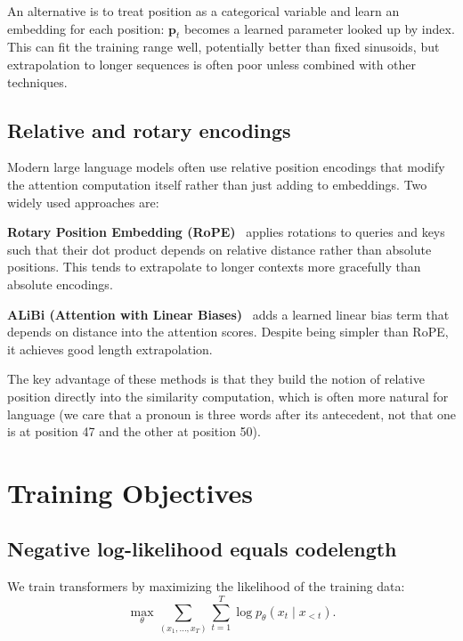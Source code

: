 An alternative is to treat position as a categorical variable and learn an embedding for each position: $\mathbf{p}_t$ becomes a learned parameter looked up by index. This can fit the training range well, potentially better than fixed sinusoids, but extrapolation to longer sequences is often poor unless combined with other techniques.

\subsection{Relative and rotary encodings}
\label{sec:relative}

Modern large language models often use relative position encodings that modify the attention computation itself rather than just adding to embeddings. Two widely used approaches are:

\textbf{Rotary Position Embedding (RoPE)}~\citep{su2021rope} applies rotations to queries and keys such that their dot product depends on relative distance rather than absolute positions. This tends to extrapolate to longer contexts more gracefully than absolute encodings.

\textbf{ALiBi (Attention with Linear Biases)}~\citep{press2022alibi} adds a learned linear bias term that depends on distance into the attention scores. Despite being simpler than RoPE, it achieves good length extrapolation.

The key advantage of these methods is that they build the notion of relative position directly into the similarity computation, which is often more natural for language (we care that a pronoun is three words after its antecedent, not that one is at position 47 and the other at position 50).

\vspace{1.2em}

\section{Training Objectives}
\label{sec:training}

\subsection{Negative log-likelihood equals codelength}
\label{sec:nll_codelength}

We train transformers by maximizing the likelihood of the training data:
\begin{equation}
\max_\theta \sum_{(x_1,\ldots,x_T)} \sum_{t=1}^{T} \log p_\theta(x_t\mid x_{<t}).
\end{equation}

